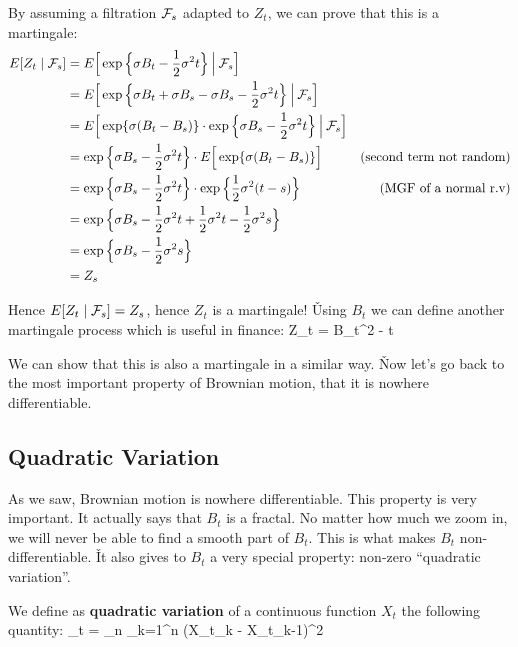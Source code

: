 By assuming a filtration $\mathcal{F}_{s}$ adapted to $Z_{t}$, we can prove that this is a martingale:
\begin{align*}
E[Z_{t} \mid \mathcal{F}_{s}] &= E \Big[ \exp \Big\{ \sigma B_{t} - \frac{1}{2} \sigma^{2} t \Big\} \: \Big| \: \mathcal{F}_{s} \Big] \\
&= E \Big[ \exp \Big\{ \sigma B_{t} + \sigma B_{s} - \sigma B_{s} - \frac{1}{2} \sigma^{2} t \Big\} \: \Big| \: \mathcal{F}_{s}
\Big] \\
&= E \Big[ \exp \{ \sigma (B_{t} - B_{s}) \} \cdot \exp \Big\{ \sigma B_{s} - \frac{1}{2} \sigma^{2} t \Big\} \: \Big|
\: \mathcal{F}_{s} \Big] \\
&= \exp \Big\{ \sigma B_{s} - \frac{1}{2} \sigma^{2} t \Big\} \cdot E \Big[ \exp \{ \sigma (B_{t} - B_{s}) \} \Big]
& \text{(second term not random)} \\
&= \exp \Big\{ \sigma B_{s} - \frac{1}{2} \sigma^{2} t \Big\} \cdot \exp \Big\{ \frac{1}{2} \sigma^{2} (t - s) \Big\}
& \text{(MGF of a normal r.v)} \\
&= \exp \Big\{ \sigma B_{s} - \frac{1}{2} \sigma^{2} t + \frac{1}{2} \sigma^{2} t - \frac{1}{2} \sigma^{2} s \Big\} \\
&= \exp \Big\{ \sigma B_{s} - \frac{1}{2} \sigma^{2} s \Big\} \\
&= Z_{s}
\end{align*}

Hence $E[Z_{t} \mid \mathcal{F}_{s}] = Z_{s}$, hence $Z_{t}$ is a martingale! \v

Using $B_{t}$ we can define another martingale process which is useful in finance:
\bse
Z_{t} = B_{t}^{2} - t
\ese

We can show that this is also a martingale in a similar way. \v

Now let's go back to the most important property of Brownian motion, that it is nowhere differentiable.

\subsection{Quadratic Variation}

As we saw, Brownian motion is nowhere differentiable. This property is very important. It actually says that
$B_{t}$ is a fractal. No matter how much we zoom in, we will never be able to find a smooth part of $B_{t}$. This
is what makes $B_{t}$ non-differentiable. \v

It also gives to $B_{t}$ a very special property: non-zero ``quadratic variation''.

We define as \textbf{quadratic variation} of a continuous function $X_{t}$ the following quantity:
\bse
[X]_{t} = \lim_{n \to \infty} \sum_{k=1}^{n} (X_{t_{k}} - X_{t_{k-1}})^{2}
\ese
\ed

